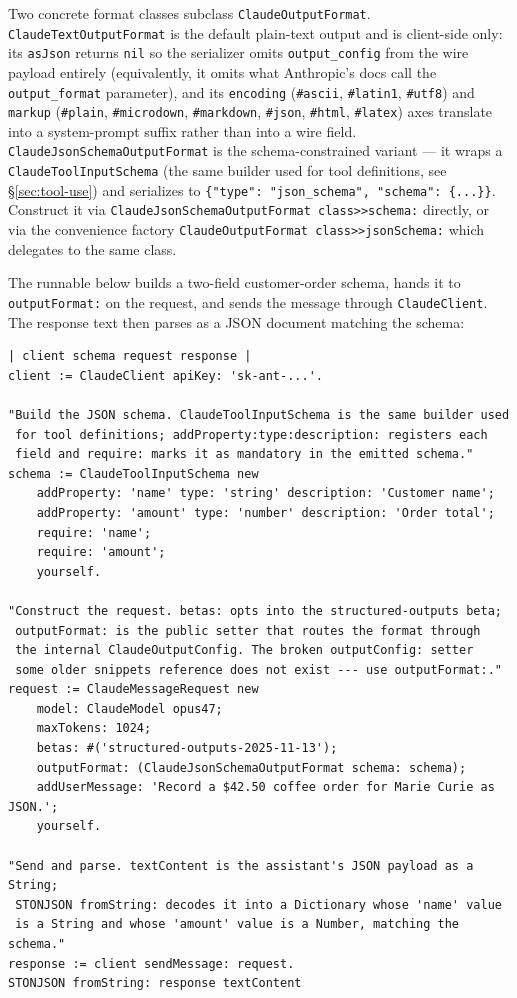 \documentclass[a4paper,10pt,fleqn]{article}
\begin{document}
\begin{sloppypar}
Two concrete format classes subclass \texttt{ClaudeOutputFormat}.
\texttt{ClaudeTextOutputFormat} is the default plain-text output
and is client-side only: its \texttt{asJson} returns \texttt{nil}
so the serializer omits \texttt{output\_config} from the wire
payload entirely (equivalently, it omits what Anthropic's docs
call the \texttt{output\_format} parameter), and its
\texttt{encoding} (\texttt{\#ascii}, \texttt{\#latin1},
\texttt{\#utf8}) and \texttt{markup} (\texttt{\#plain},
\texttt{\#microdown}, \texttt{\#markdown}, \texttt{\#json},
\texttt{\#html}, \texttt{\#latex}) axes translate into a
system-prompt suffix rather than into a wire field.
\texttt{ClaudeJsonSchemaOutputFormat} is the schema-constrained
variant --- it wraps a \texttt{ClaudeToolInputSchema} (the same
builder used for tool definitions, see §\ref{sec:tool-use}) and
serializes to \texttt{\{"type": "json\_schema", "schema": \{...\}\}}.
Construct it via \texttt{ClaudeJsonSchemaOutputFormat class>>schema:}
directly, or via the convenience factory
\texttt{ClaudeOutputFormat class>>jsonSchema:} which delegates to
the same class.
\end{sloppypar}

The runnable below builds a two-field customer-order schema, hands
it to \texttt{outputFormat:} on the request, and sends the message
through \texttt{ClaudeClient}.  The response text then parses as a
JSON document matching the schema:

\begin{lstlisting}[language={}]
| client schema request response |
client := ClaudeClient apiKey: 'sk-ant-...'.

"Build the JSON schema. ClaudeToolInputSchema is the same builder used
 for tool definitions; addProperty:type:description: registers each
 field and require: marks it as mandatory in the emitted schema."
schema := ClaudeToolInputSchema new
    addProperty: 'name' type: 'string' description: 'Customer name';
    addProperty: 'amount' type: 'number' description: 'Order total';
    require: 'name';
    require: 'amount';
    yourself.

"Construct the request. betas: opts into the structured-outputs beta;
 outputFormat: is the public setter that routes the format through
 the internal ClaudeOutputConfig. The broken outputConfig: setter
 some older snippets reference does not exist --- use outputFormat:."
request := ClaudeMessageRequest new
    model: ClaudeModel opus47;
    maxTokens: 1024;
    betas: #('structured-outputs-2025-11-13');
    outputFormat: (ClaudeJsonSchemaOutputFormat schema: schema);
    addUserMessage: 'Record a $42.50 coffee order for Marie Curie as JSON.';
    yourself.

"Send and parse. textContent is the assistant's JSON payload as a String;
 STONJSON fromString: decodes it into a Dictionary whose 'name' value
 is a String and whose 'amount' value is a Number, matching the schema."
response := client sendMessage: request.
STONJSON fromString: response textContent
\end{lstlisting}
\end{document}
